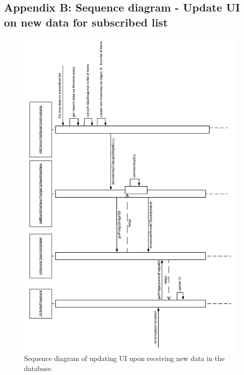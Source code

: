 \documentclass[12pt]{article}
\begin{document}
\subsection{Appendix B: Sequence diagram - Update UI on new data for subscribed list}
\begin{figure}[H]
	\centering
	\includegraphics[width=120mm]{Img/APPENDIX B - SD-onNewData.pdf}
	\caption{Sequence diagram of updating UI upon receiving new data in the database.}
	\label{fig:SD_onNewData}
\end{figure}
\end{document}
